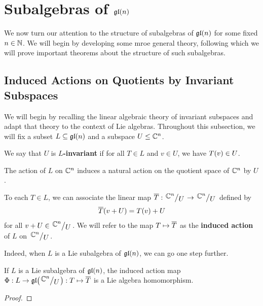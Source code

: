 \section{Subalgebras of $\mathfrak{gl}\!\left( n \right)$}

We now turn our attention to the structure of subalgebras of $\mathfrak{gl}\!\left( n \right)$ for some fixed $n \in \mathbb{N}$. We will begin by developing some mroe general theory, following which we will prove important theorems about the structure of such subalgebras.

\subsection{Induced Actions on Quotients by Invariant Subspaces}
\label{Ch1:Subsec:QuotientByInvariantSubspaces}

We will begin by recalling the linear algebraic theory of invariant subspaces and adapt that theory to the context of Lie algebras. Throughout this subsection, we will fix a subset $L \subseteq \mathfrak{gl}\!\left( n \right)$ and a subspace $U \leq \mathbb{C}^n$.

\begin{boxdefinition}[Invariance]
    We say that $U$ is \textbf{$L$-invariant} if for all $T \in L$ and $v \in U$, we have $T\!\left( v \right) \in U$.
\end{boxdefinition}

The action of $L$ on $\mathbb{C}^n$ induces a natural action on the quotient space of $\mathbb{C}^n$ by $U$.

\begin{boxdefinition}
    To each $T \in L$, we can associate the linear map $\Tbar : \quotient{\C^n}{U} \to \quotient{\C^n}{U}$ defined by
    \begin{align}
        \overline{T}(v + U) = T\!\left( v \right) + U
    \end{align}
    for all $v + U \in \quotient{\C^n}{U}$. We will refer to the map $T \mapsto \overline{T}$ as the \textbf{induced action} of $L$ on $\quotient{\C^n}{U}$.
\end{boxdefinition}

Indeed, when $L$ is a Lie subalgebra of $\mathfrak{gl}\!\left( n \right)$, we can go one step further.

\begin{boxproposition}\label{Ch1:Prop:InducedActionLieAlg}
    If $L$ is a Lie subalgebra of $\mathfrak{gl}\!\left( n \right)$, the induced action map $\Phi : L \to \gl{\quotient{\C^n}{U}} : T \mapsto \Tbar$ is a Lie algebra homomorphism.
\end{boxproposition}
\begin{proof}
    \sorry
\end{proof}

